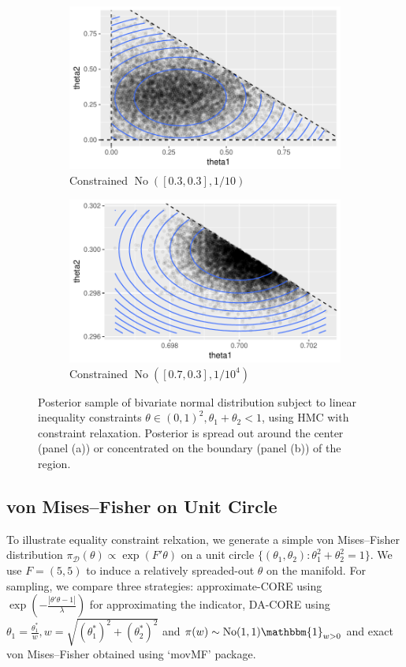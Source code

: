 \documentclass[10pt,fleqn]{article}
\newcommand{\mc}[1]{\mathcal{#1}}
\DeclareMathOperator{\No}{No}
\DeclareMathOperator{\1}{\mathbbm{1}}
\begin{document}
\begin{figure}[H]
\begin{subfigure}[b]{0.45\textwidth}
\includegraphics[width=1\textwidth]{linear_inequal_1}
\caption{Constrained $\No([0.3,0.3],1/{10})$}
\end{subfigure}
\begin{subfigure}[b]{0.45\textwidth}
\includegraphics[width=1\textwidth]{linear_inequal_2}
\caption{Constrained $\No([0.7,0.3],1/{10^4})$}
\end{subfigure}
\caption{Posterior sample of bivariate normal distribution subject to linear inequality constraints $\theta\in(0,1)^2,\theta_1+\theta_2<1$, using HMC with  constraint relaxation. Posterior is spread out around the center (panel (a)) or concentrated on the boundary (panel (b)) of the region.}
\label{linear_inequality}
\end{figure}

\subsection{von Mises--Fisher on Unit Circle}
To illustrate equality constraint relxation, we generate a simple von Mises--Fisher distribution $\pi_{\mc D}(\theta) \propto \exp(F'\theta)$ on a unit circle $\{(\theta_1,\theta_2):\theta_1^2+\theta_2^2=1\}$. We use $F=(5,5)$ to induce a relatively spreaded-out  $\theta$ on the manifold.
For sampling,
we compare three strategies: approximate-CORE using $\exp(-\frac{|\theta'\theta -1|}{\lambda})$ for approximating the indicator, DA-CORE
using $\theta_1 = \frac{\theta_1^*}{w}, w= \sqrt{(\theta_1^*)^2+ (\theta_2^*)^2}$ and $\pi(w)\sim \No(1,1)\mathbbm{1}_{w>0}$ and  exact  von Mises--Fisher obtained using `movMF' package.
\end{document}
